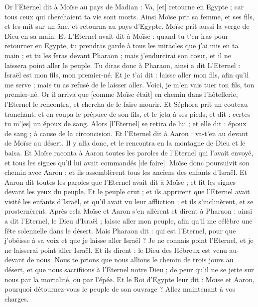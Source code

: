 \begin{multicols}{2}
Or l'Eternel dit à Moïse au pays de Madian : Va, [et] retourne en Egypte ; car tous ceux qui cherchaient ta vie sont morts.
Ainsi Moïse prit sa femme, et ses fils, et les mit sur un âne, et retourna au pays d'Egypte. Moïse prit aussi la verge de Dieu en sa main.
Et L'Eternel avait dit à Moïse : quand tu t'en iras pour retourner en Egypte, tu prendras garde à tous les miracles que j'ai mis en ta main ; et tu les feras devant Pharaon ; mais j'endurcirai son cœur, et il ne laissera point aller le peuple.
Tu diras donc à Pharaon, ainsi a dit L'Eternel : Israël est mon fils, mon premier-né.
Et je t'ai dit : laisse aller mon fils, afin qu'il me serve ; mais tu as refusé de le laisser aller. Voici, je m'en vais tuer ton fils, ton premier-né.
Or il arriva que [comme Moïse était] en chemin dans l'hôtellerie, l'Eternel le rencontra, et chercha de le faire mourir.
Et Séphora prit un couteau tranchant, et en coupa le prépuce de son fils, et le jeta à ses pieds, et dit : certes tu m'[es] un époux de sang.
Alors [l'Eternel] se retira de lui ; et elle dit : époux de sang ; à cause de la circoncision.
Et l'Eternel dit à Aaron : va-t'en au devant de Moïse au désert. Il y alla donc, et le rencontra en la montagne de Dieu et le baisa.
Et Moïse raconta à Aaron toutes les paroles de l'Eternel qui l'avait envoyé, et tous les signes qu'il lui avait commandés [de faire].
Moïse donc poursuivit son chemin avec Aaron ; et ils assemblèrent tous les anciens des enfants d'Israël.
Et Aaron dit toutes les paroles que l'Eternel avait dit à Moïse ; et fit les signes devant les yeux du peuple.
Et le peuple crut ; et ils apprirent que l'Eternel avait visité les enfants d'Israël, et qu'il avait vu leur affliction ; et ils s'inclinèrent, et se prosternèrent.
\VerseOne{}Après cela Moïse et Aaron s'en allèrent et dirent à Pharaon : ainsi a dit l'Eternel, le Dieu d'Israël ; laisse aller mon peuple, afin qu'il me célèbre une fête solennelle dans le désert.
Mais Pharaon dit : qui est l'Eternel, pour que j'obéisse à sa voix et que je laisse aller Israël ? Je ne connais point l'Eternel, et je ne laisserai point aller Israël.
Et ils dirent : le Dieu des Hébreux est venu au-devant de nous. Nous te prions que nous allions le chemin de trois jours au désert, et que nous sacrifiions à l'Eternel notre Dieu ; de peur qu'il ne se jette sur nous par la mortalité, ou par l'épée.
Et le Roi d'Egypte leur dit : Moïse et Aaron, pourquoi détournez-vous le peuple de son ouvrage ? Allez maintenant à vos charges.

\end{multicols}
